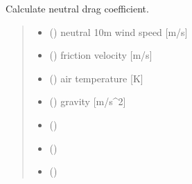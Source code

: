\documentclass[letterpaper,10pt,english]{sphinxmanual}
\begin{document}
\begin{fulllineitems}
\label{\detokenize{users_guide:AirSeaFluxCode.flux_subs.drag_coef.cdn_calc}}
\pysigstartsignatures
\pysiglinewithargsret
{}
{\sphinxparamcomma {}\sphinxparamcomma {}\sphinxparamcomma {}\sphinxparamcomma {}}
{}
\pysigstopsignatures
\sphinxAtStartPar
Calculate neutral drag coefficient.
\begin{quote}\begin{description}
\begin{itemize}
\item {}
\sphinxAtStartPar
{} () \textendash{} neutral 10m wind speed {[}m/s{]}

\item {}
\sphinxAtStartPar
{} () \textendash{} friction velocity      {[}m/s{]}

\item {}
\sphinxAtStartPar
{} () \textendash{} air temperature        {[}K{]}

\item {}
\sphinxAtStartPar
{} () \textendash{} gravity               {[}m/s\textasciicircum{}2{]}

\item {}
\sphinxAtStartPar
{} ()

\end{itemize}

\sphinxAtStartPar
\begin{itemize}
\item {}
\sphinxAtStartPar
{} ()

\item {}
\sphinxAtStartPar
{} ()

\end{itemize}


\end{description}\end{quote}

\end{fulllineitems}
\end{document}

